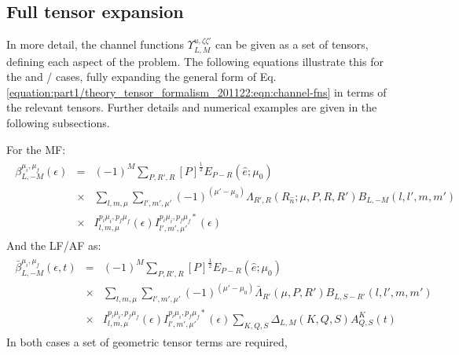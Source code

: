 \documentclass[letterpaper,table,10pt,english]{jupyterBook}
\begin{document}
\subsection{Full tensor expansion}
\label{\detokenize{part1/theory_tensor_formalism_201122:full-tensor-expansion}}\label{\detokenize{part1/theory_tensor_formalism_201122:sec-full-tensor-expansion}}
\sphinxAtStartPar
In more detail, the channel functions \(\varUpsilon_{L,M}^{u,\zeta\zeta'}\) can be given as a set of tensors, defining each aspect of the problem. The following equations illustrate this for the {\hyperref[\detokenize{backmatter/glossary:term-MF}]{}} and {\hyperref[\detokenize{backmatter/glossary:term-LF}]{}}/{\hyperref[\detokenize{backmatter/glossary:term-AF}]{}} cases, fully expanding the general form of Eq. \eqref{equation:part1/theory_tensor_formalism_201122:eqn:channel-fns} in terms of the relevant tensors. Further details and numerical examples are given in the following sub\sphinxhyphen{}sections.

\sphinxAtStartPar
For the MF:
\begin{equation}\label{equation:part1/theory_tensor_formalism_201122:eq:BLM-tensor-MF}
\begin{split}\begin{aligned}
\beta_{L,-M}^{\mu_{i},\mu_{f}}(\epsilon) & = & (-1)^{M}\sum_{P,R',R}{[P]^{\frac{1}{2}}}{E_{P-R}(\hat{e};\mu_{0})}\\
 & \times &\sum_{l,m,\mu}\sum_{l',m',\mu'}(-1)^{(\mu'-\mu_{0})}{\Lambda_{R',R}(R_{\hat{n}};\mu,P,R,R')B_{L,-M}(l,l',m,m')}\\
 & \times & I_{l,m,\mu}^{p_{i}\mu_{i},p_{f}\mu_{f}}(\epsilon)I_{l',m',\mu'}^{p_{i}\mu_{i},p_{f}\mu_{f}*}(\epsilon)\end{aligned}\end{split}
\end{equation}
\sphinxAtStartPar
And the LF/AF as:
\begin{equation}\label{equation:part1/theory_tensor_formalism_201122:eq:BLM-tensor-AF}
\begin{split}\begin{aligned}
\bar{\beta}_{L,-M}^{\mu_{i},\mu_{f}}(\epsilon,t) & = & (-1)^{M}\sum_{P,R',R}{[P]^{\frac{1}{2}}}{E_{P-R}(\hat{e};\mu_{0})}\\
 & \times &\sum_{l,m,\mu}\sum_{l',m',\mu'}(-1)^{(\mu'-\mu_{0})}{\bar{\Lambda}_{R'}(\mu,P,R')B_{L,S-R'}(l,l',m,m')}\\
 & \times &I_{l,m,\mu}^{p_{i}\mu_{i},p_{f}\mu_{f}}(\epsilon)I_{l',m',\mu'}^{p_{i}\mu_{i},p_{f}\mu_{f}*}(\epsilon)\sum_{K,Q,S}\Delta_{L,M}(K,Q,S)A_{Q,S}^{K}(t)\end{aligned}\end{split}
\end{equation}
\sphinxAtStartPar
In both cases a set of geometric tensor terms are required,
\end{document}
